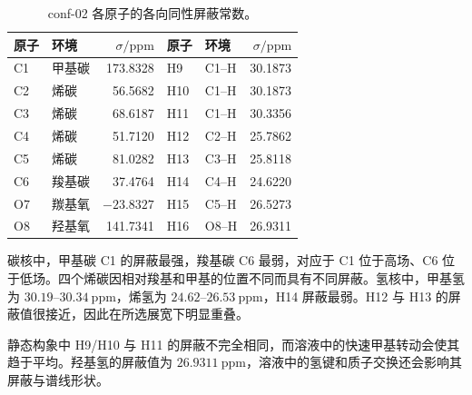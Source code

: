 \documentclass[a4paper,12pt]{article}
\begin{document}
\clearpage
\begin{table}[H]
\centering\small
\caption{conf-02 各原子的各向同性屏蔽常数。}
\begin{tabular}{llrllr}
\toprule
原子 & 环境 & $\sigma/\mathrm{ppm}$ & 原子 & 环境 & $\sigma/\mathrm{ppm}$\\
\midrule
C1 & 甲基碳 & 173.8328 & H9 & C1--H & 30.1873\\
C2 & 烯碳 & 56.5682 & H10 & C1--H & 30.1873\\
C3 & 烯碳 & 68.6187 & H11 & C1--H & 30.3356\\
C4 & 烯碳 & 51.7120 & H12 & C2--H & 25.7862\\
C5 & 烯碳 & 81.0282 & H13 & C3--H & 25.8118\\
C6 & 羧基碳 & 37.4764 & H14 & C4--H & 24.6220\\
O7 & 羰基氧 & $-23.8327$ & H15 & C5--H & 26.5273\\
O8 & 羟基氧 & 141.7341 & H16 & O8--H & 26.9311\\
\bottomrule
\end{tabular}
\end{table}
碳核中，甲基碳 C1 的屏蔽最强，羧基碳 C6 最弱，对应于 C1 位于高场、C6 位于低场。四个烯碳因相对羧基和甲基的位置不同而具有不同屏蔽。氢核中，甲基氢为 $30.19$--$30.34\ \mathrm{ppm}$，烯氢为 $24.62$--$26.53\ \mathrm{ppm}$，H14 屏蔽最弱。H12 与 H13 的屏蔽值很接近，因此在所选展宽下明显重叠。

静态构象中 H9/H10 与 H11 的屏蔽不完全相同，而溶液中的快速甲基转动会使其趋于平均。羟基氢的屏蔽值为 $26.9311\ \mathrm{ppm}$，溶液中的氢键和质子交换还会影响其屏蔽与谱线形状。
\end{document}
